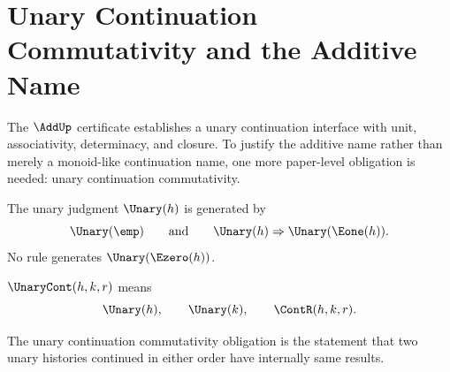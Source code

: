 \chapter{Unary Continuation Commutativity and the Additive Name}
\label{sec:concrete-hardening-unary-add-commutativity}

The \(\AddUp\) certificate establishes a unary continuation interface with unit, associativity, determinacy, and closure. To justify the additive name rather than merely a monoid-like continuation name, one more paper-level obligation is needed: unary continuation commutativity.

\begin{definition}
\label{def:unary-histories}
The unary judgment \(\Unary(h)\) is generated by
$$
  \Unary(\emp)
  \qquad\text{and}\qquad
  \Unary(h)\Rightarrow \Unary(\Eone(h)).
$$
No rule generates \(\Unary(\Ezero(h))\).
\end{definition}

\begin{definition}
\label{def:unary-continuation-result}
\(\UnaryCont(h,k,r)\) means
$$
  \Unary(h),\qquad \Unary(k),\qquad \ContR(h,k,r).
$$
\end{definition}

\begin{definition}
\label{def:unary-continuation-commutativity-obligation}
The unary continuation commutativity obligation is the statement that two unary histories continued in either order have internally same results.
\end{definition}

